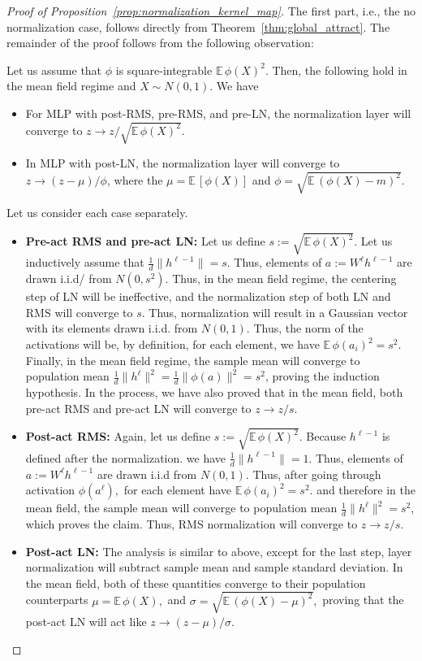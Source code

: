 \documentclass[twoside]{article}
\newcommand{\E}{\mathbb{E}\,}
\theoremstyle{definition}
\begin{document}
\begin{proof}[Proof of Proposition~\ref{prop:normalization_kernel_map}]
The first part, i.e., the no normalization case, follows directly from Theorem~\ref{thm:global_attract}. The remainder of the proof follows from the following observation:

Let us assume that $\phi$ is square-integrable $\E \phi(X)^2$. Then, the following hold in the mean field regime and $X\sim N(0,1).$ We have 
\begin{itemize}
    \item For MLP with post-RMS, pre-RMS, and pre-LN, the normalization layer will converge to  $z\to z/\sqrt{\E \phi(X)^2}$.
    \item In MLP with post-LN, the normalization layer will converge to $z \to  (z-\mu)/\phi$, where the $\mu = \E[\phi(X)]$ and $\phi = \sqrt{\E (\phi(X) - m)^2 }.$ 
\end{itemize}

Let us consider each case separately.

\begin{itemize}
    \item \textbf{Pre-act RMS and pre-act LN:} 
 Let us define $s:= \sqrt{\E \phi(X)^2}.$ Let us inductively assume that $\frac1d \|h^{\ell-1}\| = s.$ Thus, elements of $a:= W^\ell h^{\ell-1}$ are drawn i.i.d/ from $N(0,s^2).$ Thus, in the mean field regime, the centering step of LN will be ineffective, and the normalization step of both LN and RMS will converge to $s.$ Thus, normalization will result in a Gaussian vector with its elements drawn i.i.d. from $N(0,1).$ Thus, the norm of the activations will be, by definition, for each element, we have $\E \phi(a_i)^2 = s^2.$ Finally, in the mean field regime, the sample mean will converge to population mean $\frac1d\|h^\ell\|^2 = \frac1d\|\phi(a)\|^2 = s^2 $, proving the induction hypothesis. In the process, we have also proved that in the mean field, both pre-act RMS and pre-act LN will converge to $z\to z/ s.$

\item \textbf{Post-act RMS:} Again, let us define $s:= \sqrt{\E \phi(X)^2}.$ Because $h^{\ell-1}$ is defined after the normalization. we have $\frac1d \|h^{\ell-1}\| = 1.$ Thus, elements of $a:= W^\ell h^{\ell-1}$ are drawn i.i.d from $N(0,1).$ Thus, after going through activation $\phi(a^\ell),$ for each element have $\E \phi(a_i)^2 = s^2.$ and therefore in the mean field, the sample mean will converge to population mean $\frac1d\|h^\ell\|^2 = s^2 $, which proves the claim. Thus, RMS normalization will converge to $z \to z/ s.$
    \item \textbf{Post-act LN:} The analysis is similar to above, except for the last step, layer normalization will subtract sample mean and sample standard deviation. In the mean field, both of these quantities converge to their population counterparts $\mu = \E \phi(X),$ and $\sigma = \sqrt{\E (\phi(X) - \mu)^2 },$ proving that the post-act LN will act like $z \to  (z-\mu)/\sigma.$ 
\end{itemize}


\end{proof}
\end{document}
